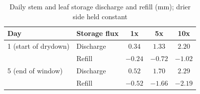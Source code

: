 \begin{table}[H]
\centering
\caption{Daily stem and leaf storage discharge and refill (mm); drier side held constant}
\label{tab:vwt_s2_one_daily_storage}
\begin{tabular}{llccc}
\hline
Day & Storage flux & 1x & 5x & 10x \\
\hline
1 (start of drydown) & Discharge & $0.34$ & $1.33$ & $2.20$ \\
 & Refill & $-0.24$ & $-0.72$ & $-1.02$ \\
\hline
5 (end of window) & Discharge & $0.52$ & $1.70$ & $2.29$ \\
 & Refill & $-0.52$ & $-1.66$ & $-2.19$ \\
\hline
\end{tabular}
\end{table}
